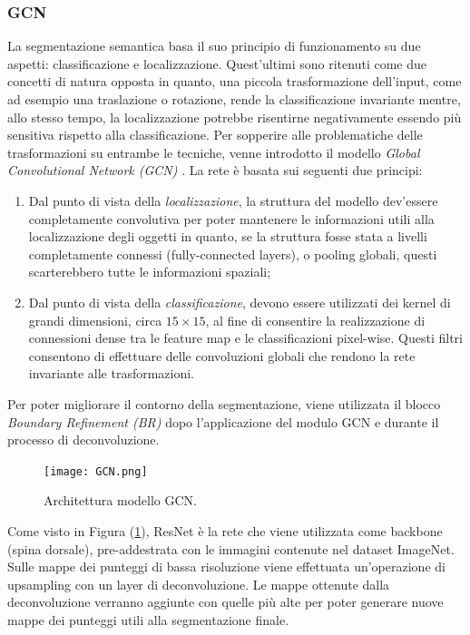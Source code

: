 \subsubsection{GCN}
La segmentazione semantica basa il suo principio di funzionamento su due aspetti: 
classificazione e localizzazione. Quest'ultimi sono ritenuti come due concetti 
di natura opposta in quanto, una piccola trasformazione dell'input, come ad 
esempio una traslazione o rotazione, rende la classificazione invariante mentre, allo 
stesso tempo, la localizzazione potrebbe risentirne negativamente essendo più sensitiva rispetto 
alla classificazione. Per sopperire alle problematiche 
delle trasformazioni su entrambe le tecniche, venne introdotto il modello \emph{Global 
Convolutional Network (GCN)} \cite{gcn}. La rete è basata sui seguenti due principi:
\begin{enumerate}
    \item Dal punto di vista della \emph{localizzazione}, la struttura del modello dev'essere 
    completamente convolutiva per poter mantenere le informazioni utili alla 
    localizzazione degli oggetti in quanto, se la struttura fosse stata a livelli 
    completamente connessi (fully-connected layers), o pooling globali, questi 
    scarterebbero tutte le informazioni spaziali;
    \item Dal punto di vista della \emph{classificazione}, devono essere utilizzati dei kernel 
    di grandi dimensioni, circa $15\times 15$, al fine di consentire la realizzazione di 
    connessioni dense tra le feature map e le classificazioni pixel-wise. Questi 
    filtri consentono di effettuare delle convoluzioni globali che rendono la rete 
    invariante alle trasformazioni.
\end{enumerate}
Per poter migliorare il contorno della segmentazione, viene utilizzata il blocco 
\emph{Boundary Refinement (BR)} dopo l'applicazione del modulo GCN e durante 
il processo di deconvoluzione.
\begin{figure}
    \centering
    \texttt{[image: GCN.png]}
    \centering
    \caption{Architettura modello GCN.}
    \label{gcn}
\end{figure}
Come visto in Figura (\ref{gcn}), ResNet è la rete che viene utilizzata come 
backbone (spina dorsale), pre-addestrata con le immagini contenute nel dataset 
ImageNet. Sulle mappe dei punteggi di bassa risoluzione viene effettuata un'operazione 
di upsampling con un layer di deconvoluzione. Le mappe ottenute dalla 
deconvoluzione verranno aggiunte con quelle più alte per poter generare nuove 
mappe dei punteggi utili alla segmentazione finale.

